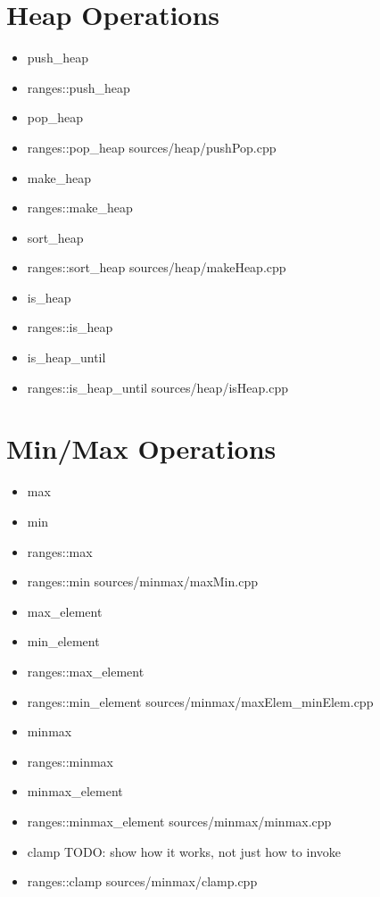 \documentclass{article}
\begin{document}
\section{Heap Operations}
    \begin{itemize}
      \item push\_heap
      \item ranges::push\_heap
      \item pop\_heap
      \item ranges::pop\_heap
         {sources/heap/pushPop.cpp}
      \item make\_heap
      \item ranges::make\_heap
      \item sort\_heap
      \item ranges::sort\_heap
         {sources/heap/makeHeap.cpp}
      \item is\_heap
      \item ranges::is\_heap
      \item is\_heap\_until
      \item ranges::is\_heap\_until
         {sources/heap/isHeap.cpp}
    \end{itemize}
\section{Min/Max Operations}
    \begin{itemize}
      \item max
      \item min
      \item ranges::max
      \item ranges::min
         {sources/minmax/maxMin.cpp}
      \item max\_element
      \item min\_element
      \item ranges::max\_element
      \item ranges::min\_element
         {sources/minmax/maxElem_minElem.cpp}
      \item minmax
      \item ranges::minmax
      \item minmax\_element
      \item ranges::minmax\_element
         {sources/minmax/minmax.cpp}
      \item clamp TODO: show how it works, not just how to invoke
      \item ranges::clamp
         {sources/minmax/clamp.cpp}
    \end{itemize}
\end{document}
